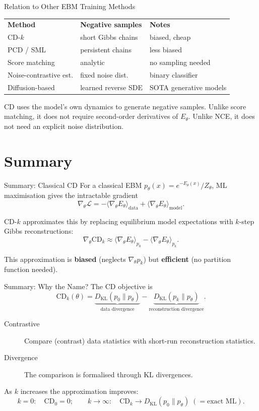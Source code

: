 \documentclass[aspectratio=169]{beamer}
\newcommand{\pmodel}{p_{\theta}}
\newcommand{\DKL}{D_{\mathrm{KL}}}
\newcommand{\Zth}{Z_\theta}
\begin{document}
\begin{frame}{Relation to Other EBM Training Methods}
\begin{tabular}{lll}
  \textbf{Method} & \textbf{Negative samples} & \textbf{Notes} \\[3pt]
  CD-$k$ & short Gibbs chains & biased, cheap \\
  PCD / SML & persistent chains & less biased \\
  Score matching & analytic & no sampling needed \\
  Noise-contrastive est. & fixed noise dist.\ & binary classifier \\
  Diffusion-based & learned reverse SDE & SOTA generative models \\
\end{tabular}

\medskip
CD uses the model's own dynamics to generate negative samples.  Unlike score
matching, it does not require second-order derivatives of $E_\theta$.  Unlike
NCE, it does not need an explicit noise distribution.
\end{frame}
\section{Summary}

\begin{frame}{Summary: Classical CD}
For a classical EBM $\pmodel(x) = e^{-E_\theta(x)}/\Zth$,
ML maximisation gives the intractable gradient
\[
  \nabla_\theta\mathcal{L}
  = -\langle\nabla_\theta E_\theta\rangle_{\mathrm{data}}
    + \langle\nabla_\theta E_\theta\rangle_{\mathrm{model}}.
\]

CD-$k$ approximates this by replacing equilibrium model expectations
with $k$-step Gibbs reconstructions:
\[
  \nabla_\theta\mathrm{CD}_k
  \approx
  \langle\nabla_\theta E_\theta\rangle_{p_0}
  -
  \langle\nabla_\theta E_\theta\rangle_{p_k}.
\]

This approximation is \textbf{biased} (neglects $\nabla_\theta p_k$) but
\textbf{efficient} (no partition function needed).
\end{frame}

\begin{frame}{Summary: Why the Name?}
The CD objective is
\[
  \mathrm{CD}_k(\theta)
  =
  \underbrace{\DKL(p_0\|\pmodel)}_{\text{data divergence}}
  -
  \underbrace{\DKL(p_k\|\pmodel)}_{\text{reconstruction divergence}}.
\]

\begin{description}
  \item[Contrastive] Compare (contrast) data statistics with short-run
        reconstruction statistics.
  \item[Divergence] The comparison is formalised through KL divergences.
\end{description}

As $k$ increases the approximation improves:
\[
  k=0: \quad \mathrm{CD}_0 = 0;
  \qquad
  k\to\infty: \quad \mathrm{CD}_k \to \DKL(p_0\|\pmodel) \;(= \text{exact ML}).
\]
\end{frame}
\end{document}
